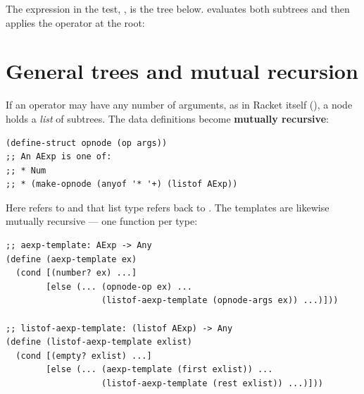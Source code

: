 The expression in the test, ,
is the tree below.  evaluates both subtrees and then applies
the operator at the root:

\begin{center}
\end{center}

\section{General trees and mutual recursion}
If an operator may have any number of arguments, as in Racket itself
(), a node holds a \emph{list} of subtrees. The data
definitions become \textbf{mutually recursive}:

\begin{lstlisting}[style=racket]
(define-struct opnode (op args))
;; An AExp is one of:
;; * Num
;; * (make-opnode (anyof '* '+) (listof AExp))
\end{lstlisting}
Here  refers to  and that list type refers back
to . The templates are likewise mutually recursive --- one function
per type:

\begin{lstlisting}[style=racket]
;; aexp-template: AExp -> Any
(define (aexp-template ex)
  (cond [(number? ex) ...]
        [else (... (opnode-op ex) ...
                   (listof-aexp-template (opnode-args ex)) ...)]))

;; listof-aexp-template: (listof AExp) -> Any
(define (listof-aexp-template exlist)
  (cond [(empty? exlist) ...]
        [else (... (aexp-template (first exlist)) ...
                   (listof-aexp-template (rest exlist)) ...)]))
\end{lstlisting}

